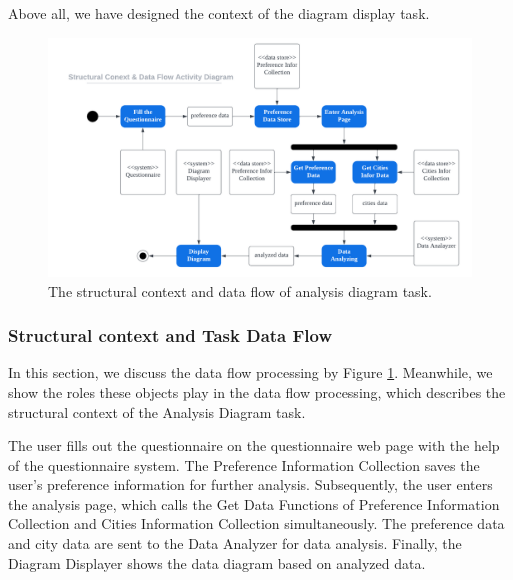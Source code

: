 \documentclass[conference]{IEEEtran}
\begin{document}
Above all, we have designed the context of the diagram display task.



\begin{figure}[htbp]
\centerline{\includegraphics[width=1.0\textwidth]{diagram_data_flow.pdf}}
\caption{The structural context and data flow of analysis diagram task.}
\label{diagram_data_flow}
\end{figure}

\subsubsection{\textbf{Structural context and Task Data Flow}}

\textbf{}

In this section, we discuss the data flow processing by Figure \ref{diagram_data_flow}. Meanwhile, we show the roles these objects play in the data flow processing, which describes the structural context of the Analysis Diagram task.

The user fills out the questionnaire on the questionnaire web page with the help of the questionnaire system. The Preference Information Collection saves the user's preference information for further analysis. Subsequently, the user enters the analysis page, which calls the Get Data Functions of Preference Information Collection and Cities Information Collection simultaneously. The preference data and city data are sent to the Data Analyzer for data analysis. Finally, the Diagram Displayer shows the data diagram based on analyzed data.
\end{document}
